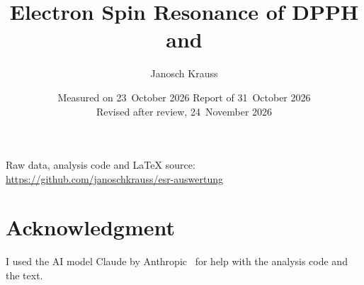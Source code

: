 \documentclass[a4paper,11pt,DIV=12,abstract=true,numbers=noenddot]{scrartcl}
\title{Electron Spin Resonance of DPPH and \ce{MnCl2}}
\author{Janosch Krauss}
\date{Measured on 23~October 2026 \textperiodcentered{} Report of 31~October 2026\\[2pt] Revised after review, 24~November 2026}
\begin{document}
\maketitle



\begin{center}\small
  Raw data, analysis code and \LaTeX{} source: \url{https://github.com/janoschkrauss/esr-auswertung}
\end{center}

\setcounter{tocdepth}{1}
\tableofcontents







\appendix


\section*{Acknowledgment}
I used the AI model Claude by Anthropic~\cite{claude} for help with the analysis code and the text.

{\small}
\end{document}

